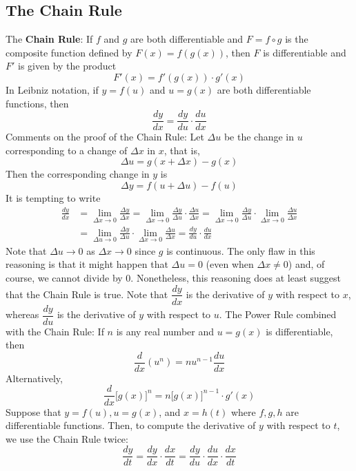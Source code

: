 \subsection{The Chain Rule}

The \textbf{Chain Rule}: If \(f\) and \(g\) are both differentiable and
\(F=f\circ g\) is the composite function defined by \(F(x)=f(g(x))\), then
\(F\) is differentiable and \(F'\) is given by the product
\[F'(x)=f'(g(x))\cdot g'(x)\]
In Leibniz notation, if \(y=f(u)\) and \(u=g(x)\) are both differentiable
functions, then
\[\frac{dy}{dx}=\frac{dy}{du}\cdot\frac{du}{dx}\]
Comments on the proof of the Chain Rule: Let \(\Delta u\) be the change in
\(u\) corresponding to a change of \(\Delta x\) in \(x\), that is,
\[\Delta u=g(x+\Delta x)-g(x)\]
Then the corresponding change in \(y\) is
\[\Delta y=f(u+\Delta u)-f(u)\]
It is tempting to write
\begin{align*}
    \frac{dy}{dx} &= \lim_{\Delta x\to 0}\frac{\Delta y}{\Delta x}
    =\lim_{\Delta x\to 0}
    \frac{\Delta y}{\Delta u}\cdot\frac{\Delta u}{\Delta x}
    =\lim_{\Delta x\to 0}\frac{\Delta y}{\Delta u}
    \cdot\lim_{\Delta x\to 0}\frac{\Delta u}{\Delta x} \\
    &= \lim_{\Delta u\to 0}\frac{\Delta y}{\Delta u}
    \cdot\lim_{\Delta x\to 0}\frac{\Delta u}{\Delta x}
    =\frac{dy}{du}\cdot\frac{du}{dx}
\end{align*}
Note that \(\Delta u\to 0\) as \(\Delta x\to 0\) since \(g\) is continuous.
The only flaw in this reasoning is that it might happen that \(\Delta u=0\)
(even when \(\Delta x\neq 0\)) and, of course, we cannot divide by 0.
Nonetheless, this reasoning does at least suggest that the Chain Rule is true.
Note that \(\dfrac{dy}{dx}\) is the derivative of \(y\) with respect to \(x\),
whereas \(\dfrac{dy}{du}\) is the derivative of \(y\) with respect to \(u\).
The Power Rule combined with the Chain Rule: If \(n\) is any real number and
\(u=g(x)\) is differentiable, then
\[\frac{d}{dx}(u^n)=nu^{n-1}\frac{du}{dx}\]
Alternatively,
\[\frac{d}{dx}\big[g(x)\big]^n=n\big[g(x)\big]^{n-1}\cdot g'(x)\]
Suppose that \(y=f(u),u=g(x)\), and \(x=h(t)\) where \(f,g,h\) are
differentiable functions.
Then, to compute the derivative of \(y\) with respect to \(t\), we use the
Chain Rule twice:
\[\frac{dy}{dt}=\frac{dy}{dx}\cdot\frac{dx}{dt}
=\frac{dy}{du}\cdot\frac{du}{dx}\cdot\frac{dx}{dt}\]

